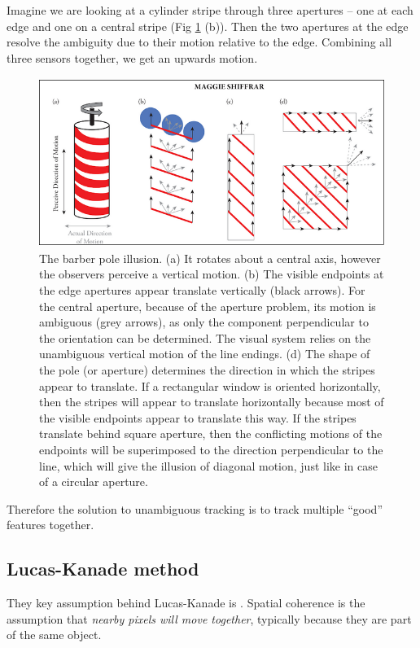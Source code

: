 \documentclass[a4paper]{article}
\begin{document}
Imagine we are looking at a cylinder stripe through three apertures -- one at each edge and one on a central stripe (Fig \ref{fig:barbers_pole} (b)). Then the two apertures at the edge resolve the ambiguity due to their motion relative to the edge. Combining all three sensors together, we get an upwards motion.

\begin{figure}[H]
    \centering
    \includegraphics[height=5.5cm]{img/opt_flow/barbers_pole.png}
    \caption{The barber pole illusion. (a) It rotates about a central axis, however the observers perceive a vertical motion. (b) The visible endpoints at the edge apertures appear translate vertically (black arrows). For the central aperture, because of the aperture problem, its motion is ambiguous (grey arrows), as only the component perpendicular to the orientation can be determined. The visual system relies on the unambiguous vertical motion of the line endings. (d) The shape of the pole (or aperture) determines the direction in which the stripes appear to translate. If a rectangular window is oriented horizontally, then the stripes will appear to translate horizontally because most of the visible endpoints appear to translate this way. If the stripes translate behind  square aperture, then the conflicting motions of the endpoints will be superimposed to the direction perpendicular to the line, which will give the illusion of diagonal motion, just like in case of a circular aperture.}
    \label{fig:barbers_pole}
\end{figure}
Therefore the solution to unambiguous tracking is to track multiple ``good'' features together.




\subsection{Lucas-Kanade method}

They key assumption behind Lucas-Kanade is . Spatial coherence is the assumption that \textit{nearby pixels will move together}, typically because they are part of the same object.
\end{document}
